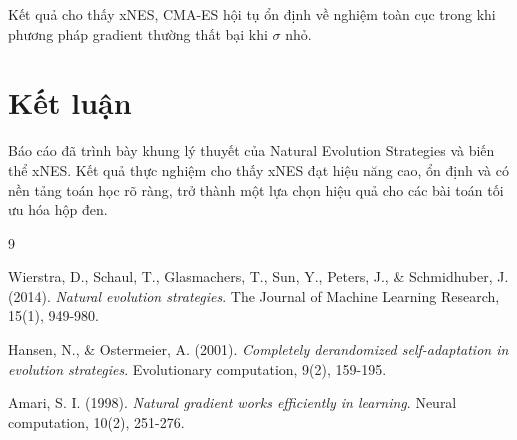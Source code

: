 \documentclass[12pt, a4paper]{article}
\begin{document}
	Kết quả cho thấy xNES, CMA-ES hội tụ ổn định về nghiệm toàn cục trong khi phương pháp gradient thường thất bại khi $\sigma$ nhỏ.
	
	\section{Kết luận}
	Báo cáo đã trình bày khung lý thuyết của Natural Evolution Strategies và biến thể xNES. Kết quả thực nghiệm cho thấy xNES đạt hiệu năng cao, ổn định và có nền tảng toán học rõ ràng, trở thành một lựa chọn hiệu quả cho các bài toán tối ưu hóa hộp đen.
	
	\begin{thebibliography}{9}
		
		Wierstra, D., Schaul, T., Glasmachers, T., Sun, Y., Peters, J., \& Schmidhuber, J. (2014).
		\textit{Natural evolution strategies}.
		The Journal of Machine Learning Research, 15(1), 949-980.
		
		Hansen, N., \& Ostermeier, A. (2001).
		\textit{Completely derandomized self-adaptation in evolution strategies}.
		Evolutionary computation, 9(2), 159-195.
		
		Amari, S. I. (1998).
		\textit{Natural gradient works efficiently in learning}.
		Neural computation, 10(2), 251-276.
		
	\end{thebibliography}
	
\end{document}
